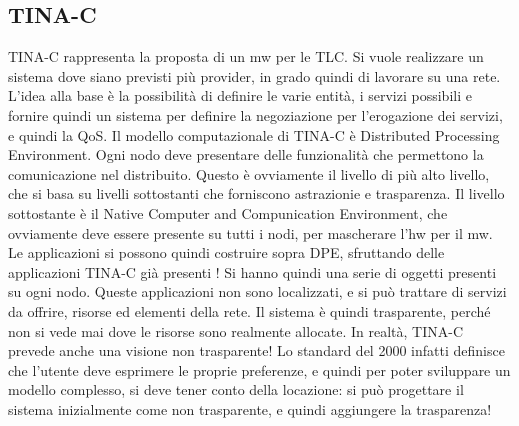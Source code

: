 \subsection{TINA-C}
TINA-C rappresenta la proposta di un mw per le TLC. Si vuole realizzare un
sistema dove siano previsti più provider, in grado quindi di lavorare su una
rete. L'idea alla base è la possibilità di definire le varie entità, i servizi possibili
e fornire quindi un sistema per definire la negoziazione per l'erogazione dei
servizi, e quindi la QoS.
Il modello computazionale di TINA-C è Distributed Processing Environment.
Ogni nodo deve presentare delle funzionalità che permettono la comunicazione
nel distribuito. Questo è ovviamente il livello di più alto livello, che si basa su
livelli sottostanti che forniscono astrazionie e trasparenza. Il livello sottostante
è il Native Computer and Compunication Environment, che ovviamente deve
essere presente su tutti i nodi, per mascherare l'hw per il mw.
Le applicazioni si possono quindi costruire sopra DPE, sfruttando delle applicazioni TINA-C già presenti ! Si hanno
quindi una serie di oggetti presenti su
ogni nodo. Queste applicazioni non sono localizzati, e si può trattare di servizi
da offrire, risorse ed elementi della rete. Il sistema è quindi trasparente, perché
non si vede mai dove le risorse sono realmente allocate.
In realtà, TINA-C prevede anche una visione non trasparente! Lo standard
del 2000 infatti definisce che l'utente deve esprimere le proprie preferenze, e
quindi per poter sviluppare un modello complesso, si deve tener conto della
locazione: si può progettare il sistema inizialmente come non trasparente, e
quindi aggiungere la trasparenza!
